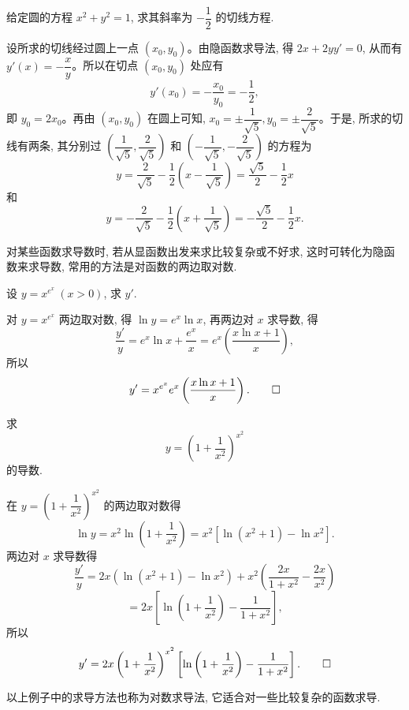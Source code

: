 \begin{example}\label{example:ma-4-2-10}
给定圆的方程 $x^2+y^2=1$, 求其斜率为 $-\dfrac12$ 的切线方程.
\end{example}


\begin{solve}
设所求的切线经过圆上一点 $(x_0,y_0)$。由隐函数求导法, 得 $2x+2yy'=0$, 从而有 $y'(x)=-\dfrac{x}{y}$。所以在切点 $(x_0,y_0)$ 处应有
\[
  y'(x_0)=-\frac{x_0}{y_0}=-\frac12,
\]
即 $y_0=2x_0$。再由 $(x_0,y_0)$ 在圆上可知, $x_0=\pm\dfrac1{\sqrt5},y_0=\pm\dfrac2{\sqrt5}$。于是, 所求的切线有两条, 其分别过 $\left(\dfrac1{\sqrt5},\dfrac2{\sqrt5}\right)$ 和 $\left(-\dfrac1{\sqrt5},-\dfrac2{\sqrt5}\right)$ 的方程为
\[
  y=\frac2{\sqrt5}-\frac12\left(x-\frac1{\sqrt5}\right)
  =
  \frac{\sqrt5}2-\frac12x
\]
和
\[
  y=-\frac2{\sqrt5}-\frac12\left(x+\frac1{\sqrt5}\right)
  =
  -\frac{\sqrt5}2-\frac12x.
\]

对某些函数求导数时, 若从显函数出发来求比较复杂或不好求, 这时可转化为隐函数来求导数, 常用的方法是对函数的两边取对数.
\end{solve}


\begin{example}\label{example:ma-4-2-11}
设 $y=x^{e^x}\ (x>0)$, 求 $y'$.
\end{example}


\begin{solve}
对 $y=x^{e^x}$ 两边取对数, 得 $\ln y=e^x\ln x$, 再两边对 $x$ 求导数, 得
\[
  \frac{y'}y=e^x\ln x+\frac{e^x}x
  =
  e^x\left(\frac{x\ln x+1}{x}\right),
\]
所以
\[
  y'=x^{e^x}e^x\left(\frac{x\ln x+1}{x}\right).
\qedhere
\]
\end{solve}


\begin{example}\label{example:ma-4-2-12}
求
\[
  y=\left(1+\frac1{x^2}\right)^{x^2}
\]
的导数.
\end{example}


\begin{solve}
在 $y=\left(1+\dfrac1{x^2}\right)^{x^2}$ 的两边取对数得
\[
  \ln y=x^2\ln\left(1+\frac1{x^2}\right)
  =
  x^2[\ln(x^2+1)-\ln x^2].
\]
两边对 $x$ 求导数得
\[
  \frac{y'}y
  =
  2x(\ln(x^2+1)-\ln x^2)
  +
  x^2\left(\frac{2x}{1+x^2}-\frac{2x}{x^2}\right)
\]
\[
  =
  2x\left[\ln\left(1+\frac1{x^2}\right)-\frac1{1+x^2}\right],
\]
所以
\[
  y'=2x\left(1+\frac1{x^2}\right)^{x^2}
  \left[\ln\left(1+\frac1{x^2}\right)-\frac1{1+x^2}\right].
\qedhere
\]
\end{solve}


\begin{remark}\label{remark:ma-4-source-53}
以上例子中的求导方法也称为对数求导法, 它适合对一些比较复杂的函数求导.
\end{remark}


